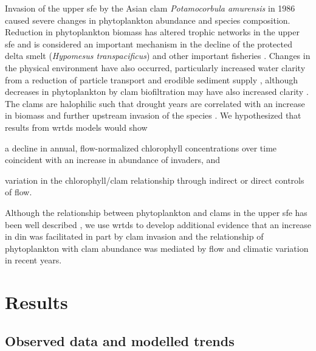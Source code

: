 \documentclass[letterpaper,12pt,oneside]{article}\usepackage[]{graphicx}\usepackage[]{color}
\begin{document}
Invasion of the upper \ac{sfe} by the Asian clam \textit{Potamocorbula amurensis} in 1986 caused severe changes in phytoplankton abundance and species composition.  Reduction in phytoplankton biomass has altered trophic networks in the upper \ac{sfe} and is considered an important mechanism in the decline of the protected delta smelt (\textit{Hypomesus transpacificus}) and other important fisheries \citep{Feyrer03,MacNally10}.  Changes in the physical environment have also occurred, particularly increased water clarity from a reduction of particle transport and erodible sediment supply \citep{Jassby08,Schoellhamer11,Cloern12b}, although decreases in phytoplankton by clam biofiltration may have also increased clarity \citep{MacNally10}. The clams are halophilic such that drought years are correlated with an increase in biomass and further upstream invasion of the species \citep{Parchaso02,Cloern12b}. We hypothesized that results from \ac{wrtds} models would show \begin{inparaenum}[1\upshape)]
\item a decline in annual, flow-normalized chlorophyll concentrations over time coincident with an increase in abundance of invaders, and
\item variation in the chlorophyll/clam relationship through indirect or direct controls of flow.
\end{inparaenum}
Although the relationship between phytoplankton and clams in the upper \ac{sfe} has been well described \citep{Kimmerer14}, we use \ac{wrtds} to develop additional evidence that an increase in \ac{din} was facilitated in part by clam invasion and the relationship of phytoplankton with clam abundance was mediated by flow and climatic variation in recent years.

\section{Results}

\subsection{Observed data and modelled trends}

\end{document}
